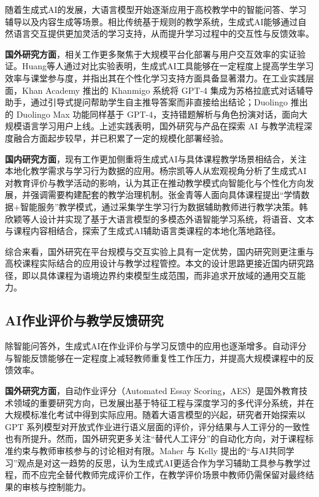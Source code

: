 \documentclass[12pt,a4paper,oneside]{ctexbook}
\numberwithin{equation}{chapter}
\begin{document}
随着生成式AI的发展，大语言模型开始逐渐应用于高校教学中的智能问答、学习辅导以及内容生成等场景。相比传统基于规则的教学系统，生成式AI能够通过自然语言交互提供更加灵活的学习支持，从而提升学习过程中的交互性与反馈效率。

\textbf{国外研究方面}，相关工作更多聚焦于大规模平台化部署与用户交互效率的实证验证。Huang等人通过对比实验表明，生成式AI工具能够在一定程度上提高学生学习效率与课堂参与度，并指出其在个性化学习支持方面具备显著潜力\cite{ref5}。在工业实践层面，Khan Academy 推出的 Khanmigo 系统将 GPT-4 集成为苏格拉底式对话辅导助手，通过引导式提问帮助学生自主推导答案而非直接给出结论；Duolingo 推出的 Duolingo Max 功能同样基于 GPT-4，支持错题解析与角色扮演对话，面向大规模语言学习用户上线。上述实践表明，国外研究与产品在探索 AI 与教学流程深度融合方面起步较早，并已积累了一定的规模化部署经验。

\textbf{国内研究方面}，现有工作更加侧重将生成式AI与具体课程教学场景相结合，关注本地化教学需求与学习行为数据的应用。杨宗凯等人从宏观视角分析了生成式AI对教育评价与教学活动的影响，认为其正在推动教学模式向智能化与个性化方向发展，并强调需要构建配套的教学治理机制\cite{ref9}。张金青等人面向具体课程提出“学情数据+智能服务”教学模式，通过采集学生学习行为数据辅助教师进行教学决策\cite{ref1}。韩欣颖等人设计并实现了基于大语言模型的多模态外语智能学习系统，将语音、文本与课程内容相结合，探索了生成式AI辅助语言类课程的本地化落地路径\cite{ref7}。

综合来看，国外研究在平台规模与交互实验上具有一定优势，国内研究则更注重与高校课程实际结合的应用设计与教学过程管控。本文的设计思路更接近国内研究路径，即以具体课程为语境边界约束模型生成范围，而非追求开放域的通用交互能力。

\subsection{AI作业评价与教学反馈研究}

除智能问答外，生成式AI在作业评价与学习反馈中的应用也逐渐增多。自动评分与智能反馈能够在一定程度上减轻教师重复性工作压力，并提高大规模课程中的反馈效率。

\textbf{国外研究方面}，自动作业评分（Automated Essay Scoring，AES）是国外教育技术领域的重要研究方向，已发展出基于特征工程与深度学习的多代评分系统，并在大规模标准化考试中得到实际应用。随着大语言模型的兴起，研究者开始探索以 GPT 系列模型对开放式作业进行语义层面的评价，评分结果与人工评分的一致性也有所提升。然而，国外研究更多关注“替代人工评分”的自动化方向，对于课程标准约束与教师审核参与的讨论相对有限。Maher 与 Kelly 提出的“与AI共同学习”观点是对这一趋势的反思，认为生成式AI更适合作为学习辅助工具参与教学过程，而不应完全替代教师完成评价工作\cite{ref6}，在教学评价场景中教师仍需保留对最终结果的审核与控制能力。
\end{document}
